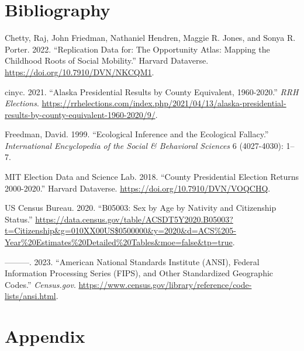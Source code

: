 \documentclass[
]{article}
\newlength{\cslhangindent}
\newenvironment{CSLReferences}[2] %
 {\begin{list}{}{%
  \setlength{\itemindent}{0pt}
  \setlength{\leftmargin}{0pt}
  \setlength{\parsep}{0pt}
  \ifodd #1
   \setlength{\leftmargin}{\cslhangindent}
   \setlength{\itemindent}{-1\cslhangindent}
  \fi
  \setlength{\itemsep}{#2\baselineskip}}}
 {\end{list}}
\begin{document}
\section{Bibliography}\label{bibliography}

\label{refs}
\begin{CSLReferences}{1}{0}
Chetty, Raj, John Friedman, Nathaniel Hendren, Maggie R. Jones, and Sonya R. Porter. 2022. {``Replication {Data} for: {The} {Opportunity} {Atlas}: {Mapping} the {Childhood} {Roots} of {Social} {Mobility}.''} Harvard Dataverse. \url{https://doi.org/10.7910/DVN/NKCQM1}.

cinyc. 2021. {``Alaska {Presidential} {Results} by {County} {Equivalent}, 1960-2020.''} \emph{RRH Elections}. \url{https://rrhelections.com/index.php/2021/04/13/alaska-presidential-results-by-county-equivalent-1960-2020/9/}.

Freedman, David. 1999. {``Ecological {Inference} and the {Ecological} {Fallacy}.''} \emph{International Encyclopedia of the Social \& Behavioral Sciences} 6 (4027-4030): 1--7.

MIT Election Data and Science Lab. 2018. {``County {Presidential} {Election} {Returns} 2000-2020.''} Harvard Dataverse. \url{https://doi.org/10.7910/DVN/VOQCHQ}.

US Census Bureau. 2020. {``B05003: {Sex} by {Age} by {Nativity} and {Citizenship} {Status}.''} \url{https://data.census.gov/table/ACSDT5Y2020.B05003?t=Citizenship&g=010XX00US$0500000&y=2020&d=ACS\%205-Year\%20Estimates\%20Detailed\%20Tables&moe=false&tp=true}.

---------. 2023. {``American {National} {Standards} {Institute} ({ANSI}), {Federal} {Information} {Processing} {Series} ({FIPS}), and {Other} {Standardized} {Geographic} {Codes}.''} \emph{Census.gov}. \url{https://www.census.gov/library/reference/code-lists/ansi.html}.

\end{CSLReferences}

\section{Appendix}\label{appendix}
\end{document}
